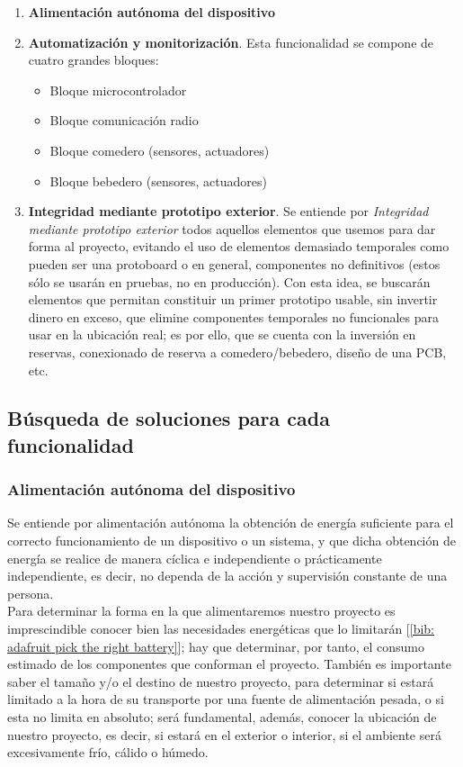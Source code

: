 \documentclass[12pt]{article}
\begin{document}
	\begin{enumerate}
		\item \textbf{Alimentación autónoma del dispositivo}
		\item \textbf{Automatización y monitorización}. Esta funcionalidad se compone de cuatro grandes bloques:
		\begin{itemize}
			\item Bloque microcontrolador
			\item Bloque comunicación radio 
			\item Bloque comedero (sensores, actuadores)
			\item Bloque bebedero (sensores, actuadores)
		\end{itemize}
	
		\item \textbf{Integridad mediante prototipo exterior}. Se entiende por \textit{Integridad mediante prototipo exterior} todos aquellos elementos que usemos para dar forma al proyecto, evitando el uso de elementos demasiado temporales como pueden ser una protoboard o en general, componentes no definitivos (estos sólo se usarán en pruebas, no en producción). Con esta  idea, se buscarán elementos que permitan constituir un primer prototipo usable, sin invertir dinero en exceso, que elimine componentes temporales no funcionales para usar en la ubicación real; es por ello, que se cuenta con la inversión en reservas, conexionado de reserva a comedero/bebedero, diseño de una PCB, etc.
	\end{enumerate}
	
	\subsection[Búsqueda soluciones]{Búsqueda de soluciones para cada funcionalidad}

	\subsubsection{Alimentación autónoma del dispositivo}
	\label{subseccion 3.2.1: búsqueda soluciones alimentación}
	\noindent Se entiende por alimentación autónoma la obtención de energía suficiente para el correcto funcionamiento de un dispositivo o un sistema, y que dicha obtención de energía se realice de manera cíclica e independiente o prácticamente independiente, es decir, no dependa de la acción y supervisión constante de una persona. \\
	
	\noindent Para determinar la forma en la que alimentaremos nuestro proyecto es imprescindible conocer bien las necesidades energéticas que lo limitarán [\ref{bib: adafruit pick the right battery}]; hay que determinar, por tanto, el consumo estimado de los componentes que conforman el proyecto. También es importante saber el tamaño y/o el destino de nuestro proyecto, para determinar si estará limitado a la hora de su transporte por una fuente de alimentación pesada, o si esta no limita en absoluto; será fundamental, además, conocer la ubicación de nuestro proyecto, es decir, si estará en el exterior o interior, si el ambiente será excesivamente frío, cálido o húmedo.\\
	
\end{document}
